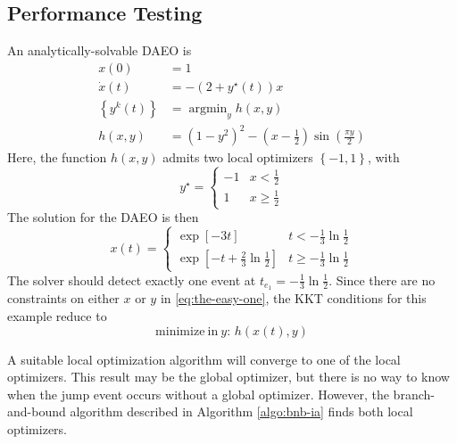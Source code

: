 \documentclass[twoside,leqno, twocolumn]{article}
\DeclareMathOperator*{\argmin}{\arg\min}
\begin{document}
\subsection{Performance Testing}
An analytically-solvable DAEO is
\begin{equation}
	\label{eq:the-easy-one}
	\begin{aligned}
		x(0) &= 1\\
		\dot x(t) &= -(2+y^\star(t))x\\
		\left\{y^k(t)\right\} &= \argmin_y h(x,y)\\
		h(x, y) &= (1-y^2)^2 - (x-\frac{1}{2})\sin\left(\frac{\pi y}{2}\right) 
	\end{aligned}
\end{equation}
Here, the function $h(x, y)$ admits two local optimizers $\left\{-1, 1\right\}$, with 
\begin{equation*}
	y^\star = \begin{cases}
		-1 & x<\frac{1}{2}\\
		1 & x \geq \frac{1}{2}
	\end{cases}
\end{equation*}
The solution for the DAEO is then
\begin{equation}
	\label{eq:easy-daeo-solution}
	x(t) = \begin{cases}
		\exp\left[-3t\right] & t < -\frac{1}{3}\ln\frac{1}{2} \\
		\exp\left[-t + \frac{2}{3}\ln\frac{1}{2}\right] & t \geq -\frac{1}{3}\ln\frac{1}{2}
	\end{cases}
\end{equation}
The solver should detect exactly one event at $t_{e_1} = -\frac{1}{3}\ln\frac{1}{2}$.
Since there are no constraints on either $x$ or $y$ in \eqref{eq:the-easy-one}, the KKT conditions for this example reduce to
\begin{equation*}
	\mathrm{minimize\ in\ } y:\,h\left(x(t), y\right)
\end{equation*}

A suitable local optimization algorithm will converge to one of the local optimizers. This result may be the global optimizer, but there is no way to know when the jump event occurs without a global optimizer. However, the branch-and-bound algorithm described in Algorithm \ref{algo:bnb-ia} finds both local optimizers.
\end{document}
